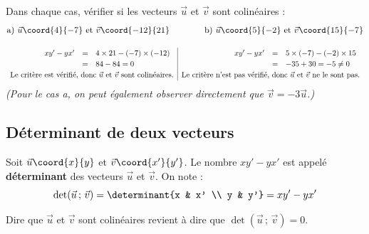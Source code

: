 \documentclass{poly}
\begin{document}
\begin{methode}
	Dans chaque cas, vérifier si les vecteurs $\vec{u}$ et $\vec{v}$ sont colinéaires :
	\[
		\text{a)}\ \vec{u}\coord{4}{-7} \text{ et } \vec{v}\coord{-12}{21}
		\qquad\qquad
		\text{b)}\ \vec{u}\coord{5}{-2} \text{ et } \vec{v}\coord{15}{-7}
	\]

	\begin{correction}
		$$
			\begin{array}{r|r}
				\def\arraystretch{1.2}
				\begin{array}{rcl}
					xy' - yx' & = & 4\times21 - (-7)\times(-12) \\
					          & = & 84 - 84 = 0
				\end{array}                                             &
				\def\arraystretch{1.2}
				\begin{array}{rcl}
					xy' - yx' & = & 5\times(-7) - (-2)\times 15 \\
					          & = & -35 + 30 = -5 \neq 0
				\end{array}                                                  \\
				\text{Le critère est vérifié, donc } \vec{u} \text{ et } \vec{v} \text{ sont colinéaires.} &
				\text{Le critère n'est pas vérifié, donc } \vec{u} \text{ et } \vec{v} \text{ ne le sont pas.}
			\end{array}
		$$
		\textit{(Pour le cas a, on peut également observer directement que $\vec{v} = -3\vec{u}$.)}
	\end{correction}
\end{methode}

\subsection{Déterminant de deux vecteurs}

\begin{defin}[Déterminant]
	Soit $\vec{u}\coord{x}{y}$ et $\vec{v}\coord{x'}{y'}$. Le nombre $xy' - yx'$ est appelé \textbf{déterminant} des vecteurs $\vec{u}$ et $\vec{v}$. On note :
	\[
		\det(\vec{u}\,;\,\vec{v}) = \determinant{x & x' \\ y & y'} = xy' - yx'
	\]
\end{defin}

\begin{prop}
	Dire que $\vec{u}$ et $\vec{v}$ sont colinéaires revient à dire que $\det(\vec{u}\,;\,\vec{v}) = 0$.
\end{prop}
\end{document}
